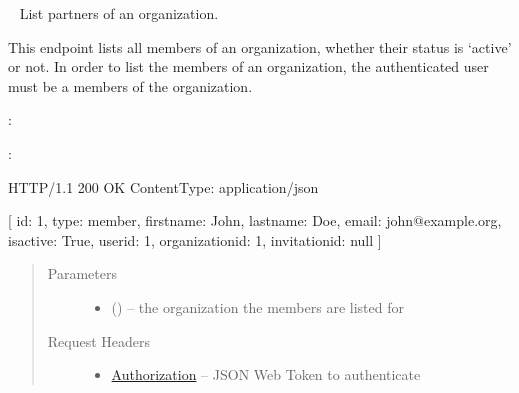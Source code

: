 \documentclass[letterpaper,10pt,english]{sphinxmanual}
\begin{document}
\begin{fulllineitems}
\label{\detokenize{resources/organization:get--organizations-(organization_id)-members}}~
List partners of an organization.

This endpoint lists all members of an organization, whether their
status is `active' or not. In order to list the members of an
organization, the authenticated user must be a members of the
organization.

:

\begin{sphinxVerbatim}[commandchars=\\\{\}]
  
 
 
\end{sphinxVerbatim}

:

\begin{sphinxVerbatim}[commandchars=\\\{\}]
HTTP/1.1 200 OK
Content\PYGZhy{}Type: application/json

[
    \PYGZob{}
        \PYGZsq{}id\PYGZsq{}: 1,
        \PYGZsq{}type\PYGZsq{}: \PYGZsq{}member\PYGZsq{},
        \PYGZsq{}firstname\PYGZsq{}: \PYGZsq{}John\PYGZsq{},
        \PYGZsq{}lastname\PYGZsq{}: \PYGZsq{}Doe\PYGZsq{},
        \PYGZsq{}email\PYGZsq{}: \PYGZsq{}john@example.org\PYGZsq{},
        \PYGZsq{}is\PYGZus{}active\PYGZsq{}: True,
        \PYGZsq{}user\PYGZus{}id\PYGZsq{}: 1,
        \PYGZsq{}organization\PYGZus{}id\PYGZsq{}: 1,
        \PYGZsq{}invitation\PYGZus{}id\PYGZsq{}: null
    \PYGZcb{}
]
\end{sphinxVerbatim}
\begin{quote}\begin{description}
\item[{Parameters}] \leavevmode\begin{itemize}
\item {} 
 () -- the organization the members are listed
for

\end{itemize}

\item[{Request Headers}] \leavevmode\begin{itemize}
\item {} 
\href{http://tools.ietf.org/html/rfc7235\#section-4.2}{Authorization} -- JSON Web Token to authenticate


\end{itemize}
\end{description}
\end{quote}
\end{fulllineitems}
\end{document}
